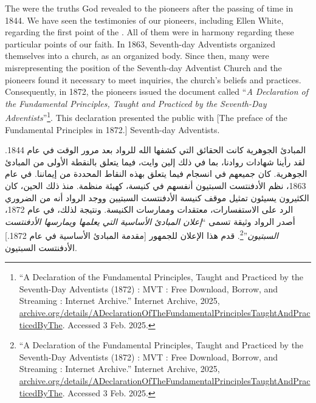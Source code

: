 The  were the truths God revealed to the pioneers after the passing of time in 1844. We have seen the testimonies of our pioneers, including Ellen White, regarding the first point of the . All of them were in harmony regarding these particular points of our faith. In 1863, Seventh-day Adventists organized themselves into a church, as an organized body. Since then, many were misrepresenting the position of the Seventh-day Adventist Church and the pioneers found it necessary to meet inquiries,  the church’s beliefs and practices. Consequently, in 1872, the pioneers issued the document called “\textit{A Declaration of the Fundamental Principles, Taught and Practiced by the Seventh-Day Adventists}”\footnote{“A Declaration of the Fundamental Principles, Taught and Practiced by the Seventh-Day Adventists (1872) : MVT : Free Download, Borrow, and Streaming : Internet Archive.” Internet Archive, 2025, \href{https://archive.org/details/ADeclarationOfTheFundamentalPrinciplesTaughtAndPracticedByThe}{archive.org/details/ADeclarationOfTheFundamentalPrinciplesTaughtAndPracticedByThe}. Accessed 3 Feb. 2025.}. This declaration presented the public with [The preface of the Fundamental Principles in 1872.] Seventh-day Adventists.


المبادئ الجوهرية كانت الحقائق التي كشفها الله للرواد بعد مرور الوقت في عام 1844. لقد رأينا شهادات روادنا، بما في ذلك إلين وايت، فيما يتعلق بالنقطة الأولى من المبادئ الجوهرية. كان جميعهم في انسجام فيما يتعلق بهذه النقاط المحددة من إيماننا. في عام 1863، نظم الأدفنتست السبتيون أنفسهم في كنيسة، كهيئة منظمة. منذ ذلك الحين، كان الكثيرون يسيئون تمثيل موقف كنيسة الأدفنتست السبتيين ووجد الرواد أنه من الضروري الرد على الاستفسارات،  معتقدات وممارسات الكنيسة. ونتيجة لذلك، في عام 1872، أصدر الرواد وثيقة تسمى “\textit{إعلان المبادئ الأساسية التي يعلمها ويمارسها الأدفنتست السبتيون}”\footnote{“A Declaration of the Fundamental Principles, Taught and Practiced by the Seventh-Day Adventists (1872) : MVT : Free Download, Borrow, and Streaming : Internet Archive.” Internet Archive, 2025, \href{https://archive.org/details/ADeclarationOfTheFundamentalPrinciplesTaughtAndPracticedByThe}{archive.org/details/ADeclarationOfTheFundamentalPrinciplesTaughtAndPracticedByThe}. Accessed 3 Feb. 2025.}. قدم هذا الإعلان للجمهور [مقدمة المبادئ الأساسية في عام 1872.] الأدفنتست السبتيون.



